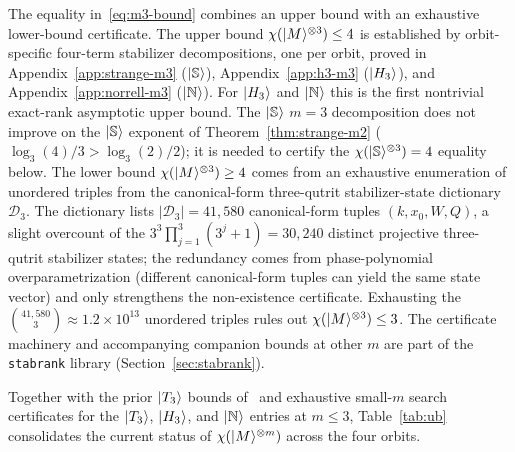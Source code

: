 \documentclass[11pt]{article}
\theoremstyle{definition}
\newcommand{\microspace}{\mspace{0.5mu}}
\newcommand{\ket}[1]{\lvert\microspace #1 \microspace \rangle}
\newcommand{\chiR}{\chi}
\newcommand{\Strange}{\ket{\mathbb{S}}}
\newcommand{\Hth}{\ket{H_3}}
\newcommand{\Norrell}{\ket{\mathbb{N}}}
\newcommand{\Tth}{\ket{T_3}}
\begin{document}
	The equality in~\eqref{eq:m3-bound} combines an upper bound with
	an exhaustive lower-bound certificate. The upper bound
	$\chiR(\ket M^{\otimes 3}) \le 4$ is established by orbit-specific
	four-term stabilizer decompositions, one per orbit, proved in
	Appendix~\ref{app:strange-m3} ($\Strange$),
	Appendix~\ref{app:h3-m3} ($\Hth$), and
	Appendix~\ref{app:norrell-m3} ($\Norrell$). For $\Hth$ and
	$\Norrell$ this is the first nontrivial exact-rank asymptotic
	upper bound. The $\Strange$ $m = 3$ decomposition does not improve
	on the $\Strange$ exponent of Theorem~\ref{thm:strange-m2}
	($\log_3(4)/3 > \log_3(2)/2$); it is needed to certify the
	$\chiR(\Strange^{\otimes 3}) = 4$ equality below. The lower bound
	$\chiR(\ket M^{\otimes 3}) \ge 4$ comes from an exhaustive
	enumeration of unordered triples from the canonical-form
	three-qutrit stabilizer-state dictionary $\mathcal{D}_3$.
	The dictionary lists $|\mathcal{D}_3| = 41{,}580$ canonical-form
	tuples $(k, x_0, W, Q)$, a slight overcount of the
	$3^3 \prod_{j=1}^{3}(3^j + 1) = 30{,}240$ distinct projective
	three-qutrit stabilizer states; the redundancy comes from
	phase-polynomial overparametrization (different canonical-form
	tuples can yield the same state vector) and only strengthens
	the non-existence certificate. Exhausting the
	$\binom{41{,}580}{3} \approx 1.2 \times 10^{13}$ unordered
	triples rules out $\chiR(\ket M^{\otimes 3}) \le 3$. The
	certificate machinery and accompanying companion
	bounds at other $m$ are part of the \texttt{stabrank} library
	(Section~\ref{sec:stabrank}).
	
	Together with the prior $\Tth$ bounds of~\cite{kocia2021improved}
	and exhaustive small-$m$ search certificates for the $\Tth$,
	$\Hth$, and $\Norrell$ entries at $m \le 3$, Table~\ref{tab:ub}
	consolidates the current status of $\chiR(\ket M^{\otimes m})$
	across the four orbits.
	
\end{document}
